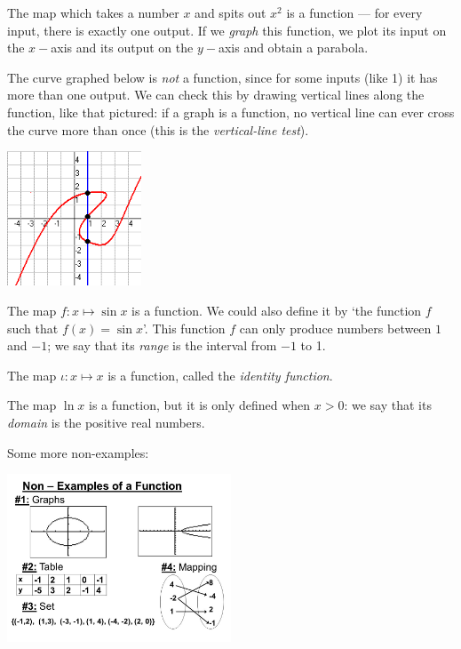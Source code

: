 \begin{ex}
  The map which takes a number $ x $ and spits out $ x^2 $ is a function --- for every input, there is exactly one output. If
  we \textit{graph} this function, we plot its input on the $ x-$axis and its output on the $ y-$axis and obtain a parabola.
\end{ex}

\begin{ex}
  The curve graphed below is \textit{not} a function, since for some inputs (like 1) it has more than one output. We can check this
  by drawing vertical lines along the function, like that pictured: if a graph is a function, no vertical line can ever cross the curve
  more than once (this is the \textit{vertical-line test}).

  \begin{center}
    \includegraphics[width=0.3\textwidth]{linetest}
  \end{center}
\end{ex}

\begin{ex}
  The map $ f : x \mapsto \sin x $ is a function. We could also define it by `the function $ f $ such that $ f(x) = \sin x $'.
  This function $ f $ can only produce numbers between $1$ and $-1$; we say that its \textit{range} is the interval from $ -1 $ to 1.
\end{ex}

\begin{ex}
  The map $ \iota : x \mapsto x $ is a function, called the \textit{identity function}.
\end{ex}

\begin{ex}
  The map $ \ln x $ is a function, but it is only defined when $ x > 0 $: we say that its \textit{domain} is the positive real numbers.
\end{ex}

\begin{ex}
  Some more non-examples:

  \begin{center}
    \includegraphics[width=0.5\textwidth]{notfunction}
  \end{center}
\end{ex}

